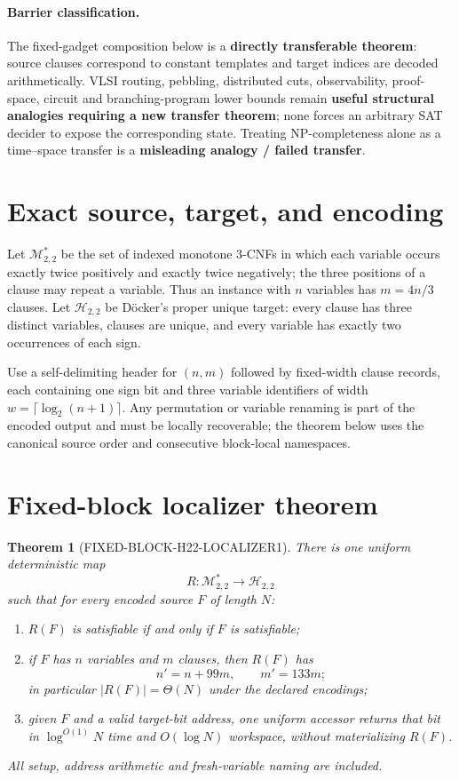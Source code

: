 \documentclass[11pt]{article}
\newtheorem{theorem}{Theorem}
\begin{document}
\paragraph{Barrier classification.}
The fixed-gadget composition below is a \textbf{directly transferable
theorem}: source clauses correspond to constant templates and target indices
are decoded arithmetically.  VLSI routing, pebbling, distributed cuts,
observability, proof-space, circuit and branching-program lower bounds remain
\textbf{useful structural analogies requiring a new transfer theorem}; none
forces an arbitrary SAT decider to expose the corresponding state.  Treating
NP-completeness alone as a time--space transfer is a \textbf{misleading analogy
/ failed transfer}.

\section{Exact source, target, and encoding}

Let $\mathcal M^{*}_{2,2}$ be the set of indexed monotone 3-CNFs in which
each variable occurs exactly twice positively and exactly twice negatively;
the three positions of a clause may repeat a variable.  Thus an instance with
$n$ variables has $m=4n/3$ clauses.  Let $\mathcal H_{2,2}$ be D\"ocker's
proper unique target: every clause has three distinct variables, clauses are
unique, and every variable has exactly two occurrences of each sign.

Use a self-delimiting header for $(n,m)$ followed by fixed-width clause
records, each containing one sign bit and three variable identifiers of width
$w=\lceil\log_2(n+1)\rceil$.  Any permutation or variable renaming is part of
the encoded output and must be locally recoverable; the theorem below uses the
canonical source order and consecutive block-local namespaces.

\section{Fixed-block localizer theorem}

\begin{theorem}[FIXED-BLOCK-H22-LOCALIZER1]
There is one uniform deterministic map
\[
 R:\mathcal M^{*}_{2,2}\longrightarrow\mathcal H_{2,2}
\]
such that for every encoded source $F$ of length $N$:
\begin{enumerate}
\item $R(F)$ is satisfiable if and only if $F$ is satisfiable;
\item if $F$ has $n$ variables and $m$ clauses, then $R(F)$ has
\[
 n'=n+99m,\qquad m'=133m;
\]
in particular $|R(F)|=\Theta(N)$ under the declared encodings;
\item given $F$ and a valid target-bit address, one uniform accessor returns
that bit in $\log^{O(1)}N$ time and $O(\log N)$ workspace, without
materializing $R(F)$.
\end{enumerate}
All setup, address arithmetic and fresh-variable naming are included.
\end{theorem}
\end{document}
